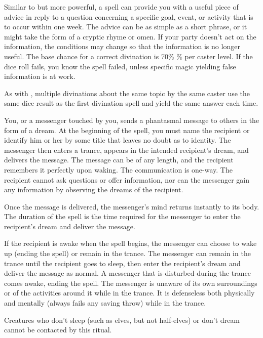 \begin{spelleffect}
Similar to  but more powerful, a  spell can provide you with a useful piece of advice in reply to a question concerning a specific goal, event, or activity that is to occur within one week. The advice can be as simple as a short phrase, or it might take the form of a cryptic rhyme or omen. If your party doesn't act on the information, the conditions may change so that the information is no longer useful. The base chance for a correct divination is 70\% \% per caster level. If the dice roll fails, you know the spell failed, unless specific magic yielding false information is at work.
\end{spelleffect}
\begin{spellnotes}
\par As with , multiple divinations about the same topic by the same caster use the same dice result as the first divination spell and yield the same answer each time.
\end{spellnotes}

\begin{spelleffect}
You, or a messenger touched by you, sends a phantasmal message to others in the form of a dream. At the beginning of the spell, you must name the recipient or identify him or her by some title that leaves no doubt as to identity. The messenger then enters a trance, appears in the intended recipient's dream, and delivers the message. The message can be of any length, and the recipient remembers it perfectly upon waking. The communication is one-way. The recipient cannot ask questions or offer information, nor can the messenger gain any information by observing the dreams of the recipient.
\par Once the message is delivered, the messenger's mind returns instantly to its body. The duration of the spell is the time required for the messenger to enter the recipient's dream and deliver the message.
\par If the recipient is awake when the spell begins, the messenger can choose to wake up (ending the spell) or remain in the trance. The messenger can remain in the trance until the recipient goes to sleep, then enter the recipient's dream and deliver the message as normal. A messenger that is disturbed during the trance comes awake, ending the spell. The messenger is unaware of its own surroundings or of the activities around it while in the trance. It is defenseless both physically and mentally (always fails any saving throw) while in the trance.
\end{spelleffect}
\begin{spellnotes}
Creatures who don't sleep (such as elves, but not half-elves) or don't dream cannot be contacted by this ritual. 
\end{spellnotes}

